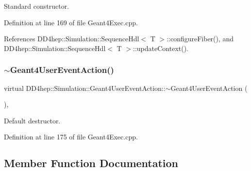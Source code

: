Standard constructor. 



Definition at line 169 of file Geant4\+Exec.\+cpp.



References D\+D4hep\+::\+Simulation\+::\+Sequence\+Hdl$<$ T $>$\+::configure\+Fiber(), and D\+D4hep\+::\+Simulation\+::\+Sequence\+Hdl$<$ T $>$\+::update\+Context().

\hypertarget{class_d_d4hep_1_1_simulation_1_1_geant4_user_event_action_ac79b641d26fd4e4cbecc99460baf4d4f}{}\label{class_d_d4hep_1_1_simulation_1_1_geant4_user_event_action_ac79b641d26fd4e4cbecc99460baf4d4f} 
\subsubsection{\texorpdfstring{$\sim$\+Geant4\+User\+Event\+Action()}{~Geant4UserEventAction()}}
{\footnotesize\ttfamily virtual D\+D4hep\+::\+Simulation\+::\+Geant4\+User\+Event\+Action\+::$\sim$\+Geant4\+User\+Event\+Action (\begin{DoxyParamCaption}{ }\end{DoxyParamCaption})\hspace{0.3cm}{\ttfamily [inline]}, {\ttfamily [virtual]}}



Default destructor. 



Definition at line 175 of file Geant4\+Exec.\+cpp.



\subsection{Member Function Documentation}
\hypertarget{class_d_d4hep_1_1_simulation_1_1_geant4_user_event_action_ab88c990f7010805421170eeb8f86ff86}{}\label{class_d_d4hep_1_1_simulation_1_1_geant4_user_event_action_ab88c990f7010805421170eeb8f86ff86} 
